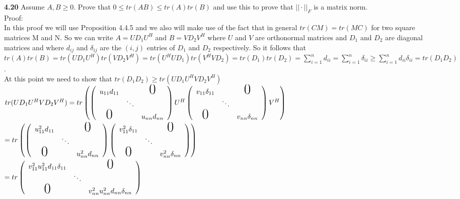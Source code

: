 \documentclass[letterpaper,12pt]{article}
\theoremstyle{definition}
\begin{document}
\textbf{4.20}
Assume $A,B\geq 0$. Prove that $0\leq tr(AB) \leq tr(A)tr(B)$ and use this to prove that $||\cdot||_F$ is a matrix norm.\\
Proof:\\
In this proof we will use Proposition 4.4.5 and we also will make use of the fact that in general $tr(CM) = tr(MC)$ for two square matrices M and N. So we can write $A = UD_1U^H$ and $B=VD_2V^H$ where $U$ and $V$ are orthonormal matrices and $D_1$ and $D_2$ are diagonal matrices and where $d_{ij}$ and $\delta_{ij}$ are the $(i,j)$ entries of $D_1$ and $D_2$ respectively. So it follows that $tr(A)tr(B) = tr(UD_1U^H)tr(VD_2V^H) = tr(U^HUD_1)tr(V^HVD_2) = tr(D_1)tr(D_2) = \sum\limits_{i=1}^n d_{ii} = \sum\limits_{i=1}^n \delta_{ii} \geq \sum\limits_{i=1}^{n}d_{ii}\delta_{ii} = tr(D_1D_2)$.\\
At this point we need to show that $tr(D_1D_2)\geq tr(UD_1U^HVD_2V^H)$\\
$tr(UD_1U^HVD_2V^H) = tr\left(     \left( \begin{array}{ccccc}
u_{11}d_{11} &     & \text{\huge0}  \\
          &\ddots             &   \\
    \text{\huge0}      &      & u_{nn}d_{nn}
  \end{array}\right)
  U^H
  \left(\begin{array}{ccccc}
v_{11}\delta_{11} &     & \text{\huge0}  \\
          &\ddots             &   \\
    \text{\huge0}      &      & v_{nn}\delta_{nn}
  \end{array}\right)
V^H\right)$\\
$=
tr\left( \left(\begin{array}{ccccc}
u_{11}^2d_{11} &     & \text{\huge0}  \\
          &\ddots             &   \\
    \text{\huge0}      &      & u_{nn}^2d_{nn}
  \end{array}\right)
  \left(\begin{array}{ccccc}
v_{11}^2\delta_{11} &     & \text{\huge0}  \\
          &\ddots             &   \\
    \text{\huge0}      &      & v_{nn}^2\delta_{nn}
  \end{array}\right)\right)$\\
  $=
   tr\left(\begin{array}{ccccc}
v_{11}^2u_{11}^2d_{11}\delta_{11} &     & \text{\huge0}  \\
          &\ddots             &   \\
    \text{\huge0}      &      & v_{nn}^2u_{nn}^2d_{nn}\delta_{nn}
  \end{array}
  \right)$\\
  
\end{document}
